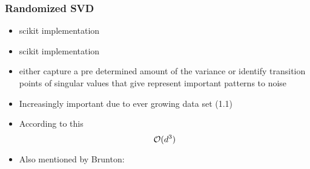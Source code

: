 \clearpage


\subsubsection{Randomized SVD}

\begin{itemize}
	\item \cite{halko2011finding} scikit implementation
	\item \cite{martinsson2011randomized} scikit implementation
	\item \cite{brunton2019data} either capture a pre determined amount of the variance or identify transition points of singular values that give represent important patterns to noise
	\item Increasingly important due to ever growing data set \cite{brunton2019data} (1.1)
	\item According to this \cite{HandsOnMLCh8}
	$$\mathcal{O}(d^3)$$
	\item Also mentioned by Brunton: \cite{sarlos2006improved}
\end{itemize}

\ \clearpage
\ \clearpage


